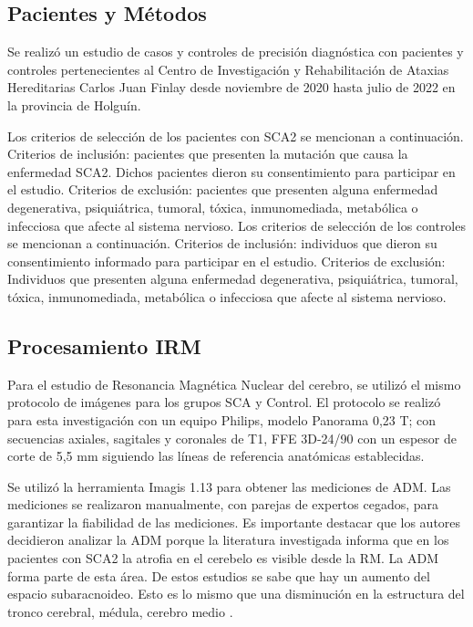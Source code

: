 \documentclass[a4paper,12pt]{article}
\begin{document}
\subsection{Pacientes y Métodos}
Se realizó un estudio de casos y controles de precisión diagnóstica con pacientes y controles pertenecientes al Centro de Investigación y Rehabilitación de Ataxias Hereditarias Carlos Juan Finlay desde noviembre de 2020 hasta julio de 2022 en la provincia de Holguín. 


Los criterios de selección de los pacientes con SCA2 se mencionan a continuación. Criterios de inclusión: pacientes que presenten la mutación que causa la enfermedad SCA2. Dichos pacientes dieron su consentimiento para participar en el estudio. Criterios de exclusión: pacientes que presenten alguna enfermedad degenerativa, psiquiátrica, tumoral, tóxica, inmunomediada, metabólica o infecciosa que afecte al sistema nervioso. Los criterios de selección de los controles se mencionan a continuación. Criterios de inclusión: individuos que dieron su consentimiento informado para participar en el estudio. Criterios de exclusión: Individuos que presenten alguna enfermedad degenerativa, psiquiátrica, tumoral, tóxica, inmunomediada, metabólica o infecciosa que afecte al sistema nervioso.

\subsection{Procesamiento IRM}

Para el estudio de Resonancia Magnética Nuclear del cerebro, se utilizó el mismo protocolo de imágenes para los grupos SCA y Control.   El protocolo se realizó para esta investigación con un equipo Philips, modelo Panorama 0,23 T; con secuencias axiales, sagitales y coronales de T1, FFE 3D-24/90 con un espesor de corte de 5,5 mm siguiendo las líneas de referencia anatómicas establecidas. 

Se utilizó la herramienta Imagis 1.13 para obtener las mediciones de ADM. Las mediciones se realizaron manualmente, con parejas de expertos cegados, para garantizar la fiabilidad de las mediciones. Es importante destacar que los autores decidieron analizar la ADM porque la literatura investigada informa que en los pacientes con SCA2 la atrofia en el cerebelo es visible desde la RM. La ADM forma parte de esta área. De estos estudios se sabe que hay un aumento del espacio subaracnoideo. Esto es lo mismo que una disminución en la estructura del tronco cerebral, médula, cerebro medio \cite{reetz_brain_2018,jandeaux_biometry_2019,miranda_cerebellar_2022}.
\end{document}
